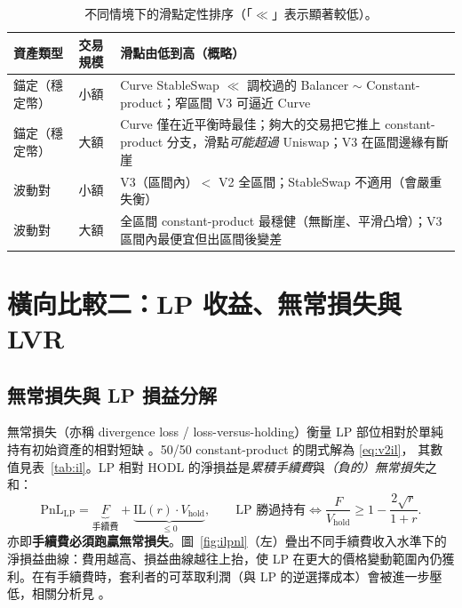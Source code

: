\documentclass[11pt,a4paper]{article}
\newcommand{\IL}{\mathrm{IL}}
\begin{document}
\begin{table}[H]\centering\small
\caption{不同情境下的滑點定性排序（「$\ll$」表示顯著較低）。}
\label{tab:sliporder}
\begin{tabularx}{\linewidth}{l l X}
\toprule
資產類型 & 交易規模 & 滑點由低到高（概略） \\
\midrule
錨定（穩定幣） & 小額 & Curve StableSwap $\ll$ 調校過的 Balancer $\sim$ Constant-product；窄區間 V3 可逼近 Curve \\
錨定（穩定幣） & 大額 & Curve 僅在近平衡時最佳；夠大的交易把它推上 constant-product 分支，滑點\emph{可能超過} Uniswap；V3 在區間邊緣有斷崖 \\
波動對 & 小額 & V3（區間內）$<$ V2 全區間；StableSwap 不適用（會嚴重失衡） \\
波動對 & 大額 & 全區間 constant-product 最穩健（無斷崖、平滑凸增）；V3 區間內最便宜但出區間後變差 \\
\bottomrule
\end{tabularx}
\end{table}

\section{橫向比較二：LP 收益、無常損失與 LVR}\label{sec:il}
\subsection{無常損失與 LP 損益分解}
無常損失（亦稱 divergence loss / loss-versus-holding）衡量 LP 部位相對於單純持有初始資產的相對短缺 \citep{pintailgooddeal,pintailreturns}。50/50 constant-product 的閉式解為 \eqref{eq:v2il}，
其數值見表~\ref{tab:il}。LP 相對 HODL 的淨損益是\emph{累積手續費}與\emph{（負的）無常損失}之和：
\begin{equation}\label{eq:pnl}
\mathrm{PnL}_{\text{LP}}=\underbrace{F}_{\text{手續費}}+\underbrace{\IL(r)\cdot V_{\text{hold}}}_{\le 0},
\qquad\text{LP 勝過持有}\iff \frac{F}{V_{\text{hold}}}\ge 1-\frac{2\sqrt{r}}{1+r}.
\end{equation}
亦即\textbf{手續費必須跑贏無常損失}。圖~\ref{fig:ilpnl}（左）疊出不同手續費收入水準下的淨損益曲線：費用越高、損益曲線越往上抬，使 LP 在更大的價格變動範圍內仍獲利。在有手續費時，套利者的可萃取利潤（與 LP 的逆選擇成本）會被進一步壓低，相關分析見 \citet{milionis2023fees}。

\begin{table}[H]\centering\small
\caption{無常損失隨價格比 $r$ 的變化（單位：\%）。Curve（pegged）在錨點附近近乎為 0。}
\label{tab:il}

\end{table}
\end{document}
